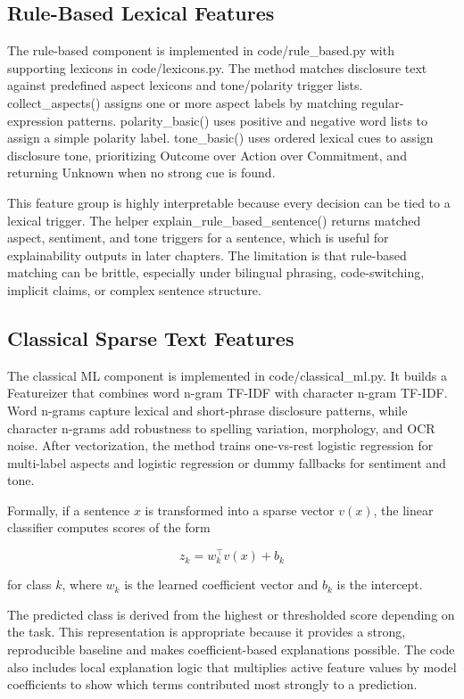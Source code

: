 \documentclass[english, online, cse, master]{dithesis}
\begin{document}
\subsection{Rule-Based Lexical Features}

The rule-based component is implemented in code/rule\_based.py with supporting lexicons in code/lexicons.py. The method matches disclosure text against predefined aspect lexicons and tone/polarity trigger lists. collect\_aspects() assigns one or more aspect labels by matching regular-expression patterns. polarity\_basic() uses positive and negative word lists to assign a simple polarity label. tone\_basic() uses ordered lexical cues to assign disclosure tone, prioritizing Outcome over Action over Commitment, and returning Unknown when no strong cue is found.

This feature group is highly interpretable because every decision can be tied to a lexical trigger. The helper explain\_rule\_based\_sentence() returns matched aspect, sentiment, and tone triggers for a sentence, which is useful for explainability outputs in later chapters. The limitation is that rule-based matching can be brittle, especially under bilingual phrasing, code-switching, implicit claims, or complex sentence structure.

\subsection{Classical Sparse Text Features}

The classical ML component is implemented in code/classical\_ml.py. It builds a Featureizer that combines word n-gram TF-IDF with character n-gram TF-IDF. Word n-grams capture lexical and short-phrase disclosure patterns, while character n-grams add robustness to spelling variation, morphology, and OCR noise. After vectorization, the method trains one-vs-rest logistic regression for multi-label aspects and logistic regression or dummy fallbacks for sentiment and tone.

Formally, if a sentence \(x\) is transformed into a sparse vector \(v(x)\),
the linear classifier computes scores of the form

\[
z_k = w_k^\top v(x) + b_k
\]

for class \(k\), where \(w_k\) is the learned coefficient vector and \(b_k\)
is the intercept. 

The predicted class is derived from the highest or thresholded score depending on the task. This representation is appropriate because it provides a strong, reproducible baseline and makes coefficient-based explanations possible. The code also includes local explanation logic that multiplies active feature values by model coefficients to show which terms contributed most strongly to a prediction.
\end{document}
